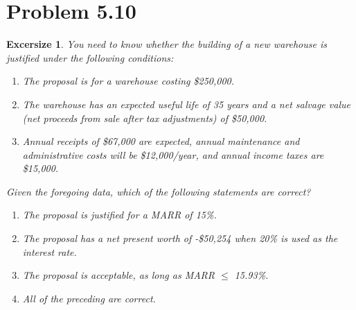 \documentclass[../INDE250HW.tex]{subfiles}
\newtheorem{exrc}{Excersize}
\begin{document}
\newpage
\section*{Problem 5.10}
\begin{exrc}
    You need to know whether the building of a new warehouse is justified under the following conditions:
    \begin{enumerate}
        \item The proposal is for a warehouse costing \$250,000.
        \item The warehouse has an expected useful life of 35 years and a net salvage value (net proceeds from sale after tax adjustments) of \$50,000.
        \item Annual receipts of \$67,000 are expected, annual maintenance and administrative costs will be \$12,000/year, and annual income taxes are \$15,000.
    \end{enumerate}
    Given the foregoing data, which of the following statements are correct?
    \begin{enumerate}
        \item The proposal is justified for a MARR of 15\%.
        \item The proposal has a net present worth of -\$50,254 when 20\% is used as the interest rate.
        \item The proposal is acceptable, as long as MARR $\leq$ 15.93\%.
        \item All of the preceding are correct.
    \end{enumerate}
\end{exrc}

\newpage
\end{document}
